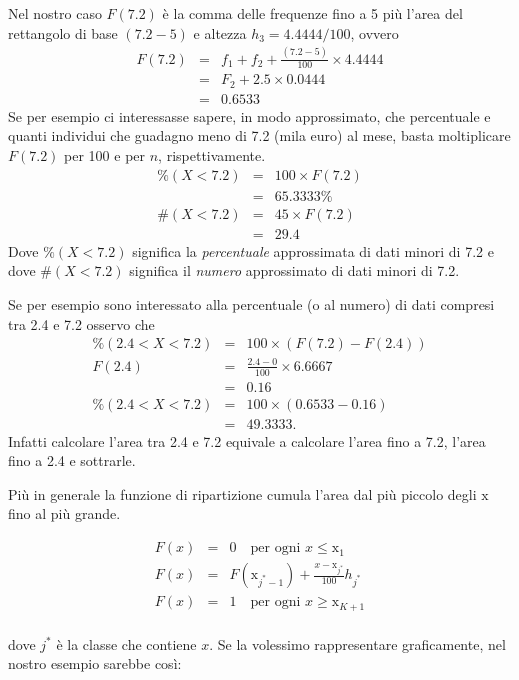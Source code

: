 \documentclass[
  11pt,
]{book}
\theoremstyle{mytheoremstyle}
\theoremstyle{mydefstyle}
\begin{document}
Nel nostro caso \(F(7.2)\) è la comma delle frequenze fino a 5 più l'area del rettangolo di base \((7.2-5)\) e altezza \(h_3=4.4444/100\), ovvero
\begin{eqnarray*}
   F(7.2) &=& f_1+f_2+\frac{(7.2-5)}{100}\times4.4444 \\
   &=& F_2 +2.5\times0.0444\\
   &=& 0.6533
\end{eqnarray*}
Se per esempio ci interessasse sapere, in modo approssimato, che percentuale e quanti
individui che guadagno meno di 7.2 (mila euro) al mese, basta moltiplicare
\(F(7.2)\) per 100 e per \(n\), rispettivamente.
\begin{eqnarray*}
   \%(X<7.2) &=& 100\times F(7.2) \\
   &=& 65.3333\% \\
   \#(X<7.2) &=& 45\times F(7.2) \\
   &=& 29.4 
\end{eqnarray*}
Dove \(\%(X<7.2)\) significa la \emph{percentuale} approssimata di dati minori di 7.2 e
dove \(\#(X<7.2)\) significa il \emph{numero} approssimato di dati minori di 7.2.

Se per esempio sono interessato alla percentuale (o al numero) di dati compresi tra
2.4 e 7.2 osservo che
\begin{eqnarray*}
   \%(2.4<X<7.2) &=& 100\times (F(7.2)-F(2.4)) \\
   F(2.4) &=& \frac{2.4-0}{100}\times6.6667 \\
   &=&0.16\\
   \%(2.4<X<7.2) &=& 100\times (0.6533-0.16) \\
   &=& 49.3333. 
\end{eqnarray*}
Infatti calcolare l'area tra 2.4 e 7.2 equivale a calcolare l'area
fino a 7.2, l'area fino a 2.4 e sottrarle.

Più in generale la funzione di ripartizione cumula l'area dal più piccolo degli \(\text{x}\) fino al
più grande.

\begin{eqnarray*}
   F(x) &=& 0 \quad \text{per ogni } x\le \text{x}_1\\
   F(x) &=& F(\text{x}_{j^*-1}) + \frac{x-\text{x}_{j^*}}{100}h_{j^*}\\
   F(x) &=& 1 \quad \text{per ogni } x\ge \text{x}_{K+1}\\
\end{eqnarray*}

dove \(j^*\) è la classe che contiene \(x\).
Se la volessimo rappresentare graficamente, nel nostro esempio sarebbe così:
\end{document}
